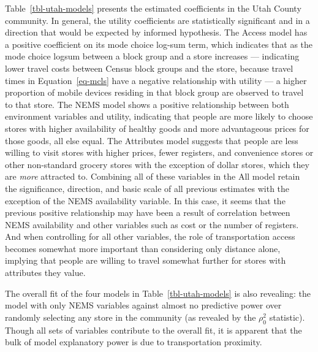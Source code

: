\documentclass[
  letterpaper,
  number,
  review,
  3p]{elsarticle}
\begin{document}
Table~\ref{tbl-utah-models} presents the estimated coefficients in the
Utah County community. In general, the utility coefficients are
statistically significant and in a direction that would be expected by
informed hypothesis. The Access model has a positive coefficient on its
mode choice log-sum term, which indicates that as the mode choice logsum
between a block group and a store increases --- indicating lower travel
costs between Census block groups and the store, because travel times in
Equation~\ref{eq-mcls} have a negative relationship with utility --- a
higher proportion of mobile devices residing in that block group are
observed to travel to that store. The NEMS model shows a positive
relationship between both environment variables and utility, indicating
that people are more likely to choose stores with higher availability of
healthy goods and more advantageous prices for those goods, all else
equal. The Attributes model suggests that people are less willing to
visit stores with higher prices, fewer registers, and convenience stores
or other non-standard grocery stores with the exception of dollar
stores, which they are \emph{more} attracted to. Combining all of these
variables in the All model retain the significance, direction, and basic
scale of all previous estimates with the exception of the NEMS
availability variable. In this case, it seems that the previous positive
relationship may have been a result of correlation between NEMS
availability and other variables such as cost or the number of
registers. And when controlling for all other variables, the role of
transportation access becomes somewhat more important than considering
only distance alone, implying that people are willing to travel somewhat
further for stores with attributes they value.

The overall fit of the four models in Table~\ref{tbl-utah-models} is
also revealing: the model with only NEMS variables against almost no
predictive power over randomly selecting any store in the community (as
revealed by the \(\rho_0^2\) statistic). Though all sets of variables
contribute to the overall fit, it is apparent that the bulk of model
explanatory power is due to transportation proximity.
\end{document}
